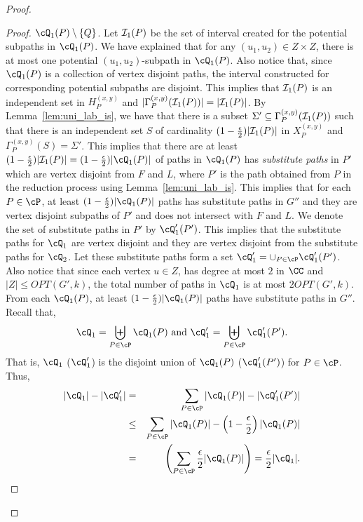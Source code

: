 \begin{proof}
\begin{proof}
$\cQ_1(P)\setminus \{Q\}$.
Let ${\cal I}_1(P)$ be the set of interval created for the potential subpaths in $\cQ_1(P)$. 
We have explained that for 
any $(u_1,u_2)\in Z \times Z$, there is at most one potential $(u_1,u_2)$-subpath in $\cQ_1(P)$. 
Also notice that, since $\cQ_1(P)$ is a collection of vertex disjoint paths, the interval 
constructed for corresponding potential subpaths are disjoint. This 
implies that ${\cal I}_1(P)$ is an independent set in  $H_P^{(x,y)}$ and 
$\vert \Gamma_P^{(x,y)}({\cal I}_1(P))\vert= \vert {\cal I}_1(P)\vert$. 
By Lemma~\ref{lem:uni_lab_is}, we have that 
there is a subset $\Sigma'\subseteq \Gamma_P^{(x,y)}({\cal I}_1(P))$
such that there is an independent set $S$ of cardinality $(1-\frac{\epsilon}{2})\vert {\cal I}_1(P)\vert$
in $X_P^{(x,y)}$ and $\Gamma_P^{(x,y)}(S)=\Sigma'$. This implies that there are at least 
$(1-\frac{\epsilon}{2})\vert {\cal I}_1(P)\vert = (1-\frac{\epsilon}{2})\vert \cQ_1(P)\vert$ 
of paths in $\cQ_1(P)$ has {\em substitute paths} in $P'$ which are vertex disjoint from 
$F$ and $L$, where $P'$ is the path obtained from $P$ in the reduction process using Lemma~\ref{lem:uni_lab_is}. This implies that for 
each $P\in \cP$, at least $(1-\frac{\epsilon}{2})\vert \cQ_1(P)\vert$ paths has 
substitute paths in $G''$ and they are vertex disjoint subpaths of $P'$ and does not intersect 
with $F$ and $L$. We denote the set of substitute paths in $P'$ by $\cQ_1'(P')$. 
This implies that the substitute paths for $\cQ_1$ are vertex disjoint and they are vertex disjoint from the 
substitute paths for $\cQ_2$. Let these substitute paths form a set $\cQ_1'=\cup_{P\in \cP}\cQ_1'(P')$. 
Also notice that 
since each vertex $u\in Z$, has degree at most $2$ in $\CC$ and $\vert Z \vert\leq OPT(G',k)$, 
the total number of paths in $\cQ_1$ is at most $2OPT(G',k)$.
From each $\cQ_1(P)$, at least $(1-\frac{\epsilon}{2})\vert \cQ_1(P)\vert$ paths have 
substitute paths in $G''$. Recall that, 
\[ \cQ_1 =\biguplus_{P\in \cP}\cQ_1(P) \mbox{ and }  \cQ_1' =\biguplus_{P\in \cP}\cQ_1'(P').\]
That is, $\cQ_1$ ($\cQ_1'$) is the disjoint union of $\cQ_1(P)$ ($\cQ_1'(P')$) for $P\in \cP$. Thus, 
\begin{eqnarray*}
\vert \cQ_1\vert -  \vert \cQ_1' \vert &= & \sum_{P\in \cP} \vert \cQ_1(P) \vert -  \vert \cQ_1'(P') \vert \\
& \leq & \sum_{P\in \cP} \vert \cQ_1(P) \vert - \left(1- \frac{\epsilon}{2}\right) \vert \cQ_1(P) \vert \\
& = & \left(\sum_{P\in \cP} \frac{\epsilon}{2} \vert \cQ_1(P) \vert  \right)=  \frac{\epsilon}{2} \vert \cQ_1 \vert.

\end{eqnarray*}
\end{proof}
\end{proof}
